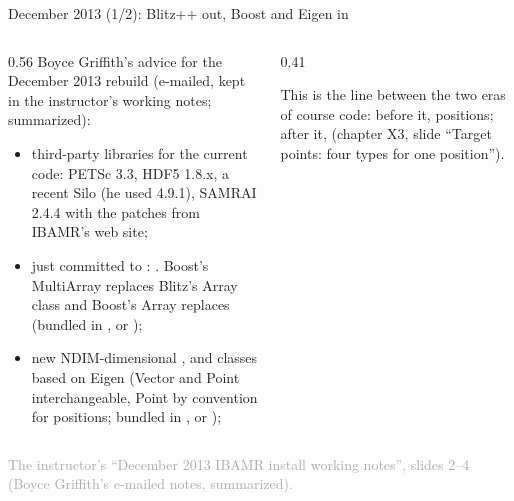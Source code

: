 \documentclass[aspectratio=169,11pt]{beamer}
\newcommand{\sourcecredit}[1]{\vfill\begin{flushright}\tiny\textcolor{DarkGray}{#1}\end{flushright}}
\begin{document}
\begin{frame}{December 2013 (1/2): Blitz++ out, Boost and Eigen in}
\label{fr:dec2013}
\begin{columns}[T,onlytextwidth]
\begin{column}{0.56\textwidth}
\footnotesize Boyce Griffith's advice for the December 2013 rebuild (e-mailed, kept in the instructor's working notes; summarized):
\begin{itemize}\setlength{\itemsep}{2pt}
  \item third-party libraries for the current code: PETSc 3.3, HDF5 1.8.x, a recent Silo (he used 4.9.1), SAMRAI 2.4.4 with the patches from IBAMR's web site;
  \item just committed to : . Boost's MultiArray replaces Blitz's Array class and Boost's Array replaces  (bundled in , or );
  \item new NDIM-dimensional ,  and  classes based on Eigen (Vector and Point interchangeable, Point by convention for positions; bundled in , or );
\end{itemize}
\end{column}
\begin{column}{0.41\textwidth}
\begin{punchbox}
\footnotesize This is the line between the two eras of course code: before it,  positions; after it,  (chapter X3, slide ``Target points: four types for one position'').
\end{punchbox}
\end{column}
\end{columns}
\sourcecredit{The instructor's ``December 2013 IBAMR install working notes'', slides 2--4 (Boyce Griffith's e-mailed notes, summarized).}
\end{frame}
\end{document}
